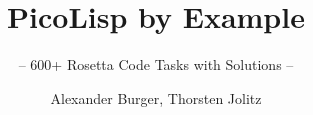 \documentclass[graybox,envcountchap,sectrefs]{svmono}
\begin{document}
\author{Alexander Burger, Thorsten Jolitz}
\title{PicoLisp by Example}
\subtitle{-- 600+ Rosetta Code Tasks with Solutions  --}
\maketitle


\frontmatter%


% 



\renewcommand\contentsname{General Contents}
\tableofcontents
\startcontents
{}



% 
\end{document}
